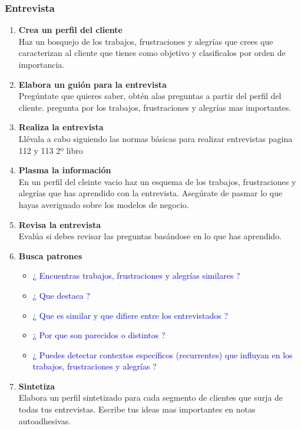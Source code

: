 \documentclass[11pt]{book}
\begin{document}
\subsubsection{Entrevista}
\begin{enumerate}
\item \textbf{Crea un perfil del cliente}\\
Haz un bosquejo de los trabajos, frustraciones y alegrías que crees que caracterizan al cliente que tienes como objetivo y clasificalos por orden de importancia.
\item \textbf{Elabora un guión para la entrevista}\\
Pregúntate que quieres saber, obtén alas preguntas a partir del perfil del cliente. pregunta por los trabajos, frustraciones y alegrías mas importantes.
\item \textbf{ Realiza la entrevista }\\
Llévala a cabo siguiendo las normas básicas para realizar entrevistas pagina 112 y 113 2º libro
\item \textbf{ Plasma la información }\\
En un perfil del cleinte vacio haz un esquema de los trabajos, frustraciones y alegrías que has aprendido con la entrevista. Asegúrate de pasmar lo que hayas averiguado sobre los modelos de negocio.
\item \textbf{ Revisa la entrevista }\\
Evalúa si debes revisar las preguntas basándose en lo que has aprendido.
\item \textbf{ Busca patrones }\\
\begin{itemize}
\item \textcolor{blue}{¿ Encuentras trabajos, frustraciones y alegrías similares ?}
\item \textcolor{blue}{¿ Que destaca ?}
\item \textcolor{blue}{¿ Que es similar y que difiere entre los entrevistados ?}
\item \textcolor{blue}{¿ Por que son parecidos o distintos ?}
\item \textcolor{blue}{¿ Puedes detectar contextos específicos (recurrentes) que influyan en los trabajos, frustraciones y alegrías ?}
\end{itemize}
\item \textbf{ Sintetiza }\\
Elabora un perfil sintetizado para cada segmento de clientes que surja de todas tus entrevistas. Escribe tus ideas mas importantes en notas autoadhesivas.
\end{enumerate}
\end{document}
